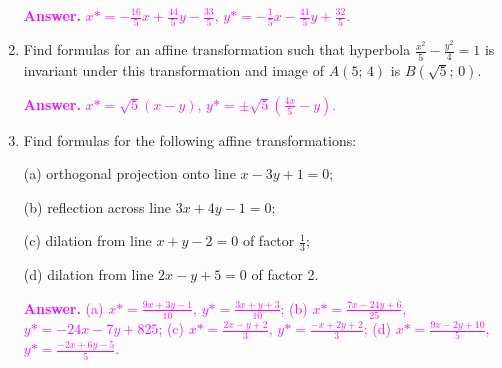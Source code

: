 \documentclass[a4paper,10pt]{article}
\begin{document}
\begin{enumerate}
\textcolor{magenta}{\textbf{Answer.} $x*=-\frac{16}5x+\frac{44}5y-\frac{33}5$, $y*=-\frac15x-\frac{41}5y+\frac{32}5$.}    
    
\item Find formulas for an affine transformation such that hyperbola $\frac{x^2}5-\frac{y^2}4=1$ is invariant under this transformation and image of $A(5;\,4)$ is $B(\sqrt5;\,0)$.

\textcolor{magenta}{\textbf{Answer.} $x*=\sqrt5(x-y)$, $y*=\pm\sqrt5\left(\frac{4x}5-y\right)$.}

\item Find formulas for the following affine transformations:

(a) orthogonal projection onto line $x-3y+1=0$;

(b) reflection across line $3x+4y-1=0$;

(c) dilation from line $x+y-2=0$ of factor $\frac13$;

(d) dilation from line $2x-y+5=0$ of factor 2.   

\textcolor{magenta}{\textbf{Answer.} (a) $x*=\frac{9x+3y-1}{10}$, $y*=\frac{3x+y+3}{10}$; (b) $x*=\frac{7x-24y+6}{25}$, $y*={-24x-7y+8}{25}$; (c) $x*=\frac{2x-y+2}3$, $y*=\frac{-x+2y+2}3$; (d) $x*=\frac{9x-2y+10}5$, $y*=\frac{-2x+6y-5}5$.}
\end{enumerate}    
\end{document}
